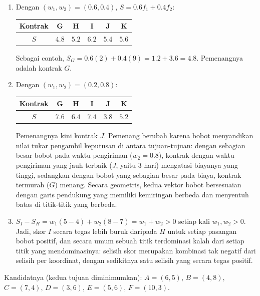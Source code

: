\begin{enumerate}
\item Dengan $(w_1, w_2) = (0.6, 0.4)$, $S = 0.6 f_1 + 0.4 f_2$:
\begin{center}
\begin{tabular}{c|ccccc}
Kontrak & G & H & I & J & K \\\hline
$S$ & $\mathbf{4.8}$ & $5.2$ & $6.2$ & $5.4$ & $5.6$ \\
\end{tabular}
\end{center}
Sebagai contoh, $S_G = 0.6(2) + 0.4(9) = 1.2 + 3.6 = 4.8$. Pemenangnya adalah
kontrak $G$.
\item Dengan $(w_1, w_2) = (0.2, 0.8)$:
\begin{center}
\begin{tabular}{c|ccccc}
Kontrak & G & H & I & J & K \\\hline
$S$ & $7.6$ & $6.4$ & $7.4$ & $\mathbf{3.8}$ & $5.2$ \\
\end{tabular}
\end{center}
Pemenangnya kini kontrak $J$. Pemenang berubah karena bobot menyandikan nilai
tukar pengambil keputusan di antara tujuan-tujuan: dengan sebagian besar bobot
pada waktu pengiriman ($w_2 = 0.8$), kontrak dengan waktu pengiriman yang jauh
terbaik ($J$, yaitu 3 hari) mengatasi biayanya yang tinggi, sedangkan dengan
bobot yang sebagian besar pada biaya, kontrak termurah ($G$) menang. Secara
geometris, kedua vektor bobot bersesuaian dengan garis pendukung yang memiliki
kemiringan berbeda dan menyentuh batas di titik-titik yang berbeda.
\item $S_I - S_H = w_1(5 - 4) + w_2(8 - 7) = w_1 + w_2 > 0$ setiap kali
$w_1, w_2 > 0$. Jadi, skor $I$ secara tegas lebih buruk daripada $H$ untuk
setiap pasangan bobot positif, dan secara umum sebuah titik terdominasi kalah
dari setiap titik yang mendominasinya: selisih skor merupakan kombinasi tak
negatif dari selisih per koordinat, dengan sedikitnya satu selisih yang secara
tegas positif.
\end{enumerate}


Kandidatnya (kedua tujuan diminimumkan):
$A = (6,5)$, $B = (4,8)$, $C = (7,4)$, $D = (3,6)$, $E = (5,6)$,
$F = (10,3)$.

